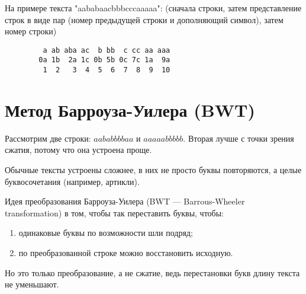 \begin{eg}
    На примере текста "aababaacbbbcccaaaaa": (сначала строки, затем представление строк в виде пар (номер предыдущей строки и дополняющий символ), затем номер строки)

    \begin{verbatim}
         a ab aba ac  b bb  c cc aa aaa
        0a 1b  2a 1c 0b 5b 0c 7c 1a  9a
         1  2   3  4  5  6  7  8  9  10
    \end{verbatim}
\end{eg}

\section{Метод Барроуза-Уилера (BWT)}

Рассмотрим две строки: $aababbbbaa$ и $aaaaabbbbb$. Вторая лучше с точки зрения сжатия, потому что она устроена проще.

Обычные тексты устроены сложнее, в них не просто буквы повторяются, а целые буквосочетания (например, артикли).

Идея преобразования Барроуза-Уилера (BWT — Barrous-Wheeler transformation) в том, чтобы так переставить буквы, чтобы:

\begin{enumerate}
    \item одинаковые буквы по возможности шли подряд;
    \item по преобразованной строке можно восстановить исходную.
\end{enumerate}

Но это только преобразование, а не сжатие, ведь перестановки букв длину текста не уменьшают.


